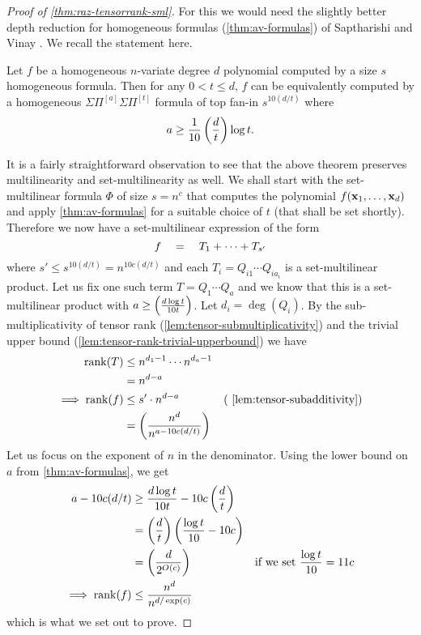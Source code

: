 \begin{proof}[Proof of \autoref{thm:raz-tensorrank-sml}]



For this we would need the slightly better depth reduction for homogeneous formulas (\autoref{thm:av-formulas}) of Saptharishi and Vinay \cite{saptharishivinay14}. We recall the statement here.
\begin{theorem*}
Let $f$ be a homogeneous $n$-variate degree $d$ polynomial computed by a size $s$ homogeneous formula. 
Then for any $0< t \leq d$, $f$ can be equivalently computed by a homogeneous $\Sigma\Pi^{[a]}\Sigma\Pi^{[t]}$ formula of top fan-in $s^{10(d/t)}$ where 
\[
a \geq \frac{1}{10}\left(\frac{d}{t}\right) \log t.
\]
\end{theorem*}
It is a fairly straightforward observation to see that the above theorem preserves multilinearity and set-multilinearity as well. We shall start with the set-multilinear formula $\Phi$ of size $s = n^c$ that computes the polynomial $f(\mathbf{x}_1,\ldots, \mathbf{x}_d)$ and apply \autoref{thm:av-formulas} for a suitable choice of $t$ (that shall be set shortly). 
Therefore we now have a set-multilinear expression of the form
\[
f \quad = \quad T_1 + \cdots + T_{s'}
\]
where $s' \leq s^{10(d/t)} = n^{10c(d/t)}$ and each $T_i = Q_{i1} \cdots Q_{ia_i}$ is a set-multilinear product. Let us fix one such term $T = Q_{1} \cdots Q_a$ and we know that this is a set-multilinear product with $a \geq \left(\frac{d\log t}{10 t}\right)$. Let $d_i = \deg(Q_i)$. By the sub-multiplicativity of tensor rank (\autoref{lem:tensor-submultiplicativity}) and the trivial upper bound (\autoref{lem:tensor-rank-trivial-upperbound}) we have
\begin{align*}
\rank(T) & \leq n^{d_1 - 1} \cdots n^{d_a - 1}\\
 & =  n^{d - a}\\
\implies \rank(f) & \leq s' \cdot n^{d-a} & \text{(~\autoref{lem:tensor-subadditivity})}\\
 & =  \pfrac{n^d}{n^{a - 10c(d/t)}}
\end{align*}
Let us focus on the exponent of $n$ in the denominator. Using the lower bound on $a$ from \autoref{thm:av-formulas}, we get
\begin{align*}
a - 10c(d/t) & \geq \frac{d\log t}{10t} - 10c\left(\frac{d}{t}\right)\\
& = \left(\frac{d}{t}\right) \left(\frac{\log t}{10} - 10c\right)\\
& = \left(\frac{d}{2^{O(c)}}\right)& \text{if we set $\frac{\log t}{10} = 11c$}\\
\implies \operatorname{rank}(f) & \leq \frac{n^d}{n^{d/\exp(c)}}
\end{align*}
which is what we set out to prove. 
\end{proof}

